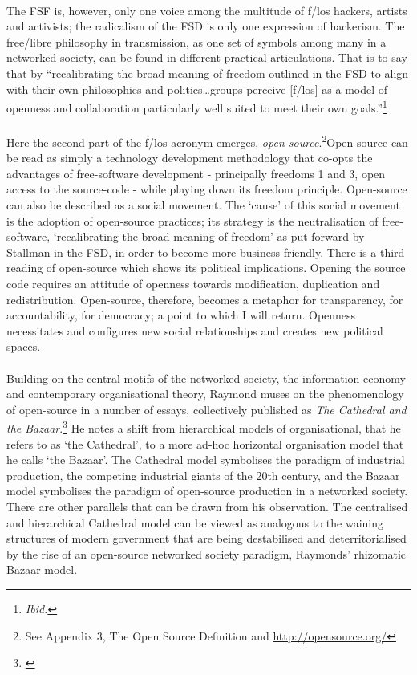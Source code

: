 \documentclass[11pt,titlepage]{book}
\begin{document}
\paragraph{}The FSF is, however, only one voice among the multitude of f/los hackers, artists and activists; the radicalism of the FSD is only one expression of hackerism. The free/libre philosophy in transmission, as one set of symbols among many in a networked society, can be found in different practical articulations. That is to say that by ``recalibrating the broad meaning of freedom outlined in the FSD to align with their own philosophies and politics\ldots groups perceive [f/los] as a model of openness and collaboration particularly well suited to meet their own goals.''\footnote{\textit{Ibid.}} 

\paragraph{}Here the second part of the f/los acronym emerges, \textit{open-source}.\footnote{See Appendix 3, The Open Source Definition and \url{http://opensource.org/}}Open-source can be read as simply a technology development methodology that co-opts the advantages of free-software development - principally freedoms 1 and 3, open access to the source-code -  while playing down its freedom principle. Open-source can also be described as a social movement. The `cause' of this social movement is the adoption of open-source 
practices; its strategy is the neutralisation of free-software, `recalibrating the broad meaning of freedom' as put forward by Stallman in the FSD, in order to become more business-friendly. There is a third reading of open-source which shows its political implications. Opening the source code requires an attitude of openness towards modification, duplication and redistribution. Open-source, therefore, becomes a metaphor for transparency, for accountability, for democracy; a point to which I will return. Openness necessitates and configures new social relationships and creates new political spaces.

\paragraph{}Building on the central motifs of the networked society, the information economy and contemporary organisational theory, Raymond muses on the phenomenology of open-source in a number of essays, collectively published as \textit{The Cathedral and the Bazaar}.\footnote{\cite{raymond:1999catb}} He notes a shift from hierarchical models of organisational, that he refers to as `the Cathedral', to a more ad-hoc horizontal organisation model that he calls `the Bazaar'. The Cathedral model symbolises the paradigm of industrial production, the competing industrial giants of the 20th century, and the Bazaar model symbolises the paradigm of open-source production in a networked society. There are other parallels that can be drawn from his observation. The centralised and hierarchical Cathedral model can be viewed as analogous to the waining structures of modern government that are being destabilised and deterritorialised by the rise of an open-source networked society paradigm, Raymonds' rhizomatic Bazaar model. 
\end{document}
